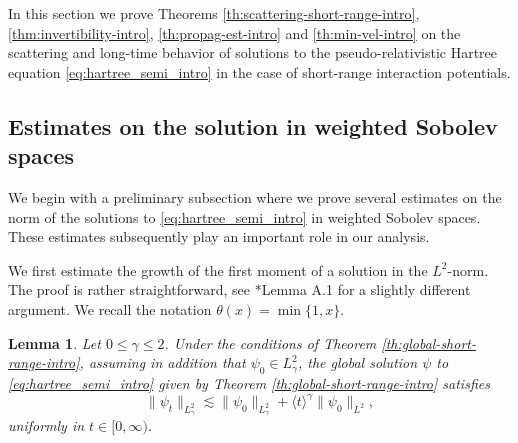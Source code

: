 \documentclass[12pt]{article}
\theoremstyle{plain}
\newtheorem{lemma}[theo]{Lemma}
\begin{document}
In this section we prove Theorems \ref{th:scattering-short-range-intro}, \ref{thm:invertibility-intro}, \ref{th:propag-est-intro} and \ref{th:min-vel-intro} on the scattering and long-time behavior of solutions to the pseudo-relativistic Hartree equation \eqref{eq:hartree_semi_intro} in the case of short-range interaction potentials. 

\subsection{Estimates on the solution  in weighted Sobolev spaces}\label{subsec:estimates_growth}

We begin with a preliminary subsection where we prove several estimates on the norm of the solutions to \eqref{eq:hartree_semi_intro} in weighted Sobolev spaces. These estimates subsequently play an important role in our analysis.



We first estimate the growth of the first moment of a solution in the $L^2$-norm. The proof is rather straightforward, see \cite{frohlich_lenzm07}*{Lemma A.1} for a slightly different argument. We recall the notation $\theta(x)=\min\{1,x\}$.

\begin{lemma}\label{lem:x-evol}
Let $0\le\gamma\le 2$. Under the conditions of Theorem \ref{th:global-short-range-intro}, assuming in addition that $\psi_0\in L^2_\gamma$, 
the global solution $\psi$ to \eqref{eq:hartree_semi_intro} given by Theorem \ref{th:global-short-range-intro} satisfies
\begin{equation}\label{eq:boundL2-0}
\|\psi_t\|_{L^2_\gamma}\lesssim\|\psi_0\|_{L^2_\gamma}+\langle t\rangle^\gamma\|\psi_0\|_{L^2},
\end{equation}
uniformly in $t\in[0,\infty)$.%
\end{lemma}
\end{document}
